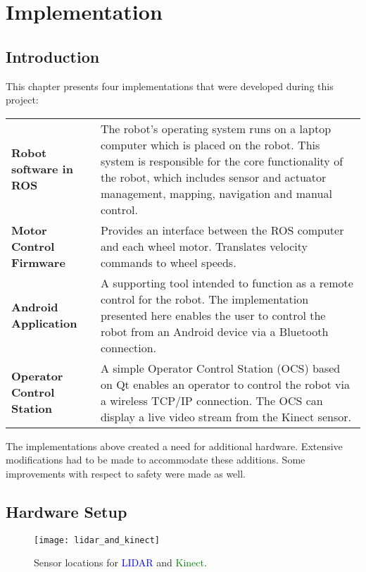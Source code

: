 \chapter{Implementation}
\label{chp:implementation} 

\section{Introduction}

This chapter presents four implementations that were developed during this project:

\begin{center}
	\begin{tabular}{ l p{7cm} }
	\textbf{Robot software in \ac{ROS}} & The robot's operating system runs on a laptop computer which is placed on the robot. This system is responsible for the core functionality of the robot, which includes sensor and actuator management, mapping, navigation and manual control.\\
	\textbf{Motor Control Firmware} & Provides an interface between the \ac{ROS} computer and each wheel motor. Translates velocity commands to wheel speeds.\\
	\textbf{Android Application} & A supporting tool intended to function as a remote control for the robot. The implementation presented here enables the user to control the robot from an Android device via a Bluetooth connection.\\
	\textbf{Operator Control Station} & A simple Operator Control Station (OCS) based on Qt enables an operator to control the robot via a wireless TCP/IP connection. The \ac{OCS} can display a live video stream from the Kinect sensor. \\
	\end{tabular}
\end{center}

The implementations above created a need for additional hardware. Extensive modifications had to be made to accommodate these additions. Some improvements with respect to safety were made as well.

\section{Hardware Setup}



\begin{figure}[h]
	\centering
	\texttt{[image: lidar\_and\_kinect]}
	\caption{Sensor locations for \textcolor{blue}{LIDAR} and \textcolor{green}{Kinect}. }
	\label{fig:kinect_and_lidar}
\end{figure}

